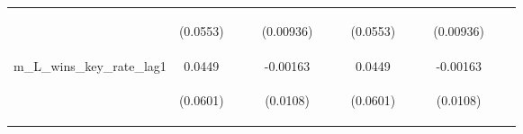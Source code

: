 \documentclass[]{article}
\begin{document}
\begin{center}
\begin{tabular}{lcccccccccccc}
\vspace{4pt} & \begin{footnotesize}(0.0553)\end{footnotesize} & \begin{footnotesize}\end{footnotesize} & \begin{footnotesize}\end{footnotesize} & \begin{footnotesize}(0.00936)\end{footnotesize} & \begin{footnotesize}\end{footnotesize} & \begin{footnotesize}\end{footnotesize} & \begin{footnotesize}(0.0553)\end{footnotesize} & \begin{footnotesize}\end{footnotesize} & \begin{footnotesize}\end{footnotesize} & \begin{footnotesize}(0.00936)\end{footnotesize} & \begin{footnotesize}\end{footnotesize} & \begin{footnotesize}\end{footnotesize} \\
m\_L\_wins\_key\_rate\_lag1 & 0.0449 &  &  & -0.00163 &  &  & 0.0449 &  &  & -0.00163 &  &  \\
\vspace{4pt} & \begin{footnotesize}(0.0601)\end{footnotesize} & \begin{footnotesize}\end{footnotesize} & \begin{footnotesize}\end{footnotesize} & \begin{footnotesize}(0.0108)\end{footnotesize} & \begin{footnotesize}\end{footnotesize} & \begin{footnotesize}\end{footnotesize} & \begin{footnotesize}(0.0601)\end{footnotesize} & \begin{footnotesize}\end{footnotesize} & \begin{footnotesize}\end{footnotesize} & \begin{footnotesize}(0.0108)\end{footnotesize} & \begin{footnotesize}\end{footnotesize} & \begin{footnotesize}\end{footnotesize} \\

\end{tabular}
\end{center}
\end{document}
